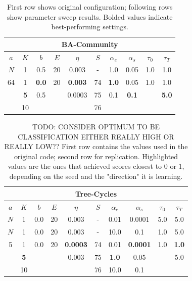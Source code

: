 \begin{table}[h]
  \centering
  \scriptsize
  \begin{tabular}{|c|c|c|c|c|c|c|c|c|c|}
  \hline
  \multicolumn{10}{|c|}{\textbf{BA-Community}} \\ \hline
  $a$ & $K$ & $b$ & $E$ & $\eta$ & $S$ & $\alpha_e$ & $\alpha_s$ & $\tau_0$ & $\tau_T$ \\ \hline
  $N$ & 1 & 0.5 & 20 & 0.003 & - & 1.0 & 0.05 & 1.0 & 1.0 \\ \hline
  64 & 1 & \textbf{0.0} & 20 & \textbf{0.003} & 74 & \textbf{1.0} & 0.05 & 1.0 & 1.0 \\
   & \textbf{5} & 0.5 &  & 0.0003 & 75 & 0.1 & \textbf{0.1} &  & \textbf{5.0} \\
   & 10 &  &  &  & 76 &  &  &  &  \\ \hline
  \end{tabular}
  \caption[BA-Community Sweep]{First row shows original configuration; following rows show parameter sweep results. Bolded values indicate best-performing settings.}
  \label{tab:BA-Community_sweep}
\end{table}

\begin{table}[h]
  \centering
  \scriptsize
  \begin{tabular}{|c|c|c|c|c|c|c|c|c|c|}
  \hline
  \multicolumn{10}{|c|}{\textbf{Tree-Cycles}} \\ \hline
  $a$ & $K$ & $b$ & $E$ & $\eta$ & $S$ & $\alpha_e$ & $\alpha_s$ & $\tau_0$ & $\tau_T$ \\ \hline
  $N$ & 1 & 0.0 & 20 & 0.003 & - & 0.01 & 0.0001 & 5.0 & 5.0 \\ \hline
  $N$ & 1 & 0.0 & 20 & 0.003 & - & 10.0 & 0.1 & 1.0 & 5.0 \\ \midrule
  5 & 1 & 0.0 & 20 & \textbf{0.0003} & 74 & 0.01 & \textbf{0.0001} & 1.0 & \textbf{1.0} \\
   & \textbf{5} &  &  & 0.003 & 75 & \textbf{1.0} & 0.05 &  & 5.0 \\
   & 10 &  &  &  & 76 & 10.0 & 0.1 &  &  \\ \hline
  \end{tabular}
  \caption[Tree-Cycles Sweep]{TODO: CONSIDER OPTIMUM TO BE CLASSIFICATION EITHER REALLY HIGH OR REALLY LOW?? First row contains the values used in the original code; second row for replication. Highlighted values are the ones that achieved scores closest to $0$ or $1$, depending on the seed and the "direction" it is learning.}
\end{table}


